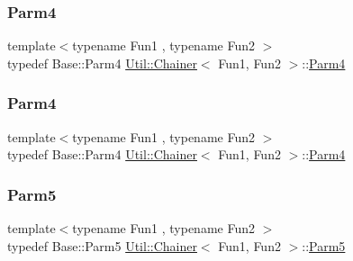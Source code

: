 \mbox{\label{classUtil_1_1Chainer_a82e756f3083e3883a05644425474f789}} 
\subsubsection{\texorpdfstring{Parm4}{Parm4}\hspace{0.1cm}{\footnotesize\ttfamily [1/2]}}
{\footnotesize\ttfamily template$<$typename Fun1 , typename Fun2 $>$ \\
typedef Base\+::\+Parm4 \mbox{\hyperlink{classUtil_1_1Chainer}{Util\+::\+Chainer}}$<$ Fun1, Fun2 $>$\+::\mbox{\hyperlink{classUtil_1_1Chainer_a82e756f3083e3883a05644425474f789}{Parm4}}}

\mbox{\label{classUtil_1_1Chainer_a82e756f3083e3883a05644425474f789}} 
\subsubsection{\texorpdfstring{Parm4}{Parm4}\hspace{0.1cm}{\footnotesize\ttfamily [2/2]}}
{\footnotesize\ttfamily template$<$typename Fun1 , typename Fun2 $>$ \\
typedef Base\+::\+Parm4 \mbox{\hyperlink{classUtil_1_1Chainer}{Util\+::\+Chainer}}$<$ Fun1, Fun2 $>$\+::\mbox{\hyperlink{classUtil_1_1Chainer_a82e756f3083e3883a05644425474f789}{Parm4}}}

\mbox{\label{classUtil_1_1Chainer_ac5fdddd223aac1cfb37abd6d681ddf69}} 
\subsubsection{\texorpdfstring{Parm5}{Parm5}\hspace{0.1cm}{\footnotesize\ttfamily [1/2]}}
{\footnotesize\ttfamily template$<$typename Fun1 , typename Fun2 $>$ \\
typedef Base\+::\+Parm5 \mbox{\hyperlink{classUtil_1_1Chainer}{Util\+::\+Chainer}}$<$ Fun1, Fun2 $>$\+::\mbox{\hyperlink{classUtil_1_1Chainer_ac5fdddd223aac1cfb37abd6d681ddf69}{Parm5}}}

